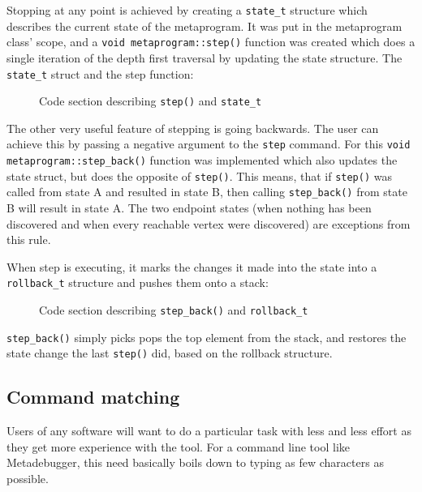 Stopping at any point is achieved by creating a \texttt{state\_t} structure
which describes the current state of the metaprogram. It was put in the
metaprogram class' scope, and a \texttt{void metaprogram::step()} function
was created which does a single iteration of the depth first traversal by
updating the state structure. The \texttt{state\_t} struct and the step
function:

\begin{figure}[H]
    \caption{Code section describing \texttt{step()} and \texttt{state\_t}}
\end{figure}

\noindent
The other very useful feature of stepping is going backwards. The user can
achieve this by passing a negative argument to the \texttt{step} command. For
this \texttt{void metaprogram::step\_back()} function was implemented which also
updates the state struct, but does the opposite of \texttt{step()}. This
means, that if \texttt{step()} was called from state A and resulted in state
B, then calling \texttt{step\_back()} from state B will result in state A.
The two endpoint states (when nothing has been discovered and when every
reachable vertex were discovered) are exceptions from this rule.

When step is executing, it marks the changes it made into the state into a
\texttt{rollback\_t} structure and pushes them onto a stack:

\begin{figure}[H]
    \caption{Code section describing \texttt{step\_back()} and
        \texttt{rollback\_t}
    }
\end{figure}

\noindent
\texttt{step\_back()} simply picks pops the top element from the stack, and
restores the state change the last \texttt{step()} did, based on the
rollback structure.


\subsection{Command matching}

Users of any software will want to do a particular task with less and less
effort as they get more experience with the tool. For a command line tool like
Metadebugger, this need basically boils down to typing as few characters as
possible.

